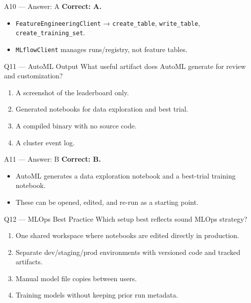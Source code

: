 \documentclass[aspectratio=169,10pt]{beamer}
\begin{document}
	\begin{frame}{A10 — Answer: A}
		\textbf{Correct: A.}
		\begin{itemize}
			\item \texttt{FeatureEngineeringClient} → \texttt{create\_table}, \texttt{write\_table}, \texttt{create\_training\_set}.
			\item \texttt{MLflowClient} manages runs/registry, not feature tables.
		\end{itemize}
	\end{frame}
	
	\begin{frame}{Q11 — AutoML Output}
		What useful artifact does AutoML generate for review and customization?
		\begin{enumerate}[label=\Alph*.]
			\item A screenshot of the leaderboard only.
			\item Generated notebooks for data exploration and best trial.
			\item A compiled binary with no source code.
			\item A cluster event log.
		\end{enumerate}
	\end{frame}
	
	\begin{frame}{A11 — Answer: B}
		\textbf{Correct: B.}
		\begin{itemize}
			\item AutoML generates a data exploration notebook and a best-trial training notebook.
			\item These can be opened, edited, and re-run as a starting point.
		\end{itemize}
	\end{frame}
	
	\begin{frame}{Q12 — MLOps Best Practice}
		Which setup best reflects sound MLOps strategy?
		\begin{enumerate}[label=\Alph*.]
			\item One shared workspace where notebooks are edited directly in production.
			\item Separate dev/staging/prod environments with versioned code and tracked artifacts.
			\item Manual model file copies between users.
			\item Training models without keeping prior run metadata.
		\end{enumerate}
	\end{frame}
	
\end{document}
